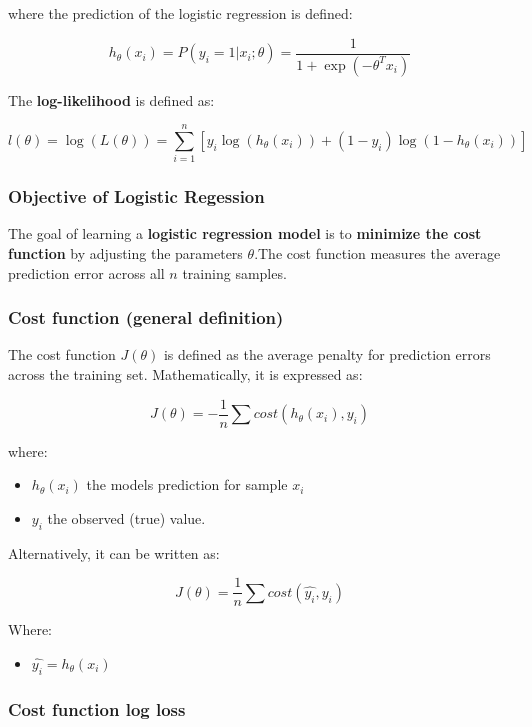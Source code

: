 \documentclass{article}
\providecommand{\tightlist}{%
  \setlength{\itemsep}{0pt}\setlength{\parskip}{0pt}}
\begin{document}
where the prediction of the logistic regression is defined:

\[h_{\theta}(x_i) = P(y_i=1 | x_i; \theta) = \frac{1}{1 + \exp(-\theta^Tx_i)}\]

The \textbf{log-likelihood} is defined as:

\[l(\theta) = \log(L(\theta))=\sum_{i=1}^n[y_i \log (h_{\theta}(x_i)) + (1 - y_i) \log(1 - h_{\theta}(x_i))]\]

\subsubsection{Objective of Logistic
Regession}\label{objective-of-logistic-regession}

The goal of learning a \textbf{logistic regression model} is to
\textbf{minimize the cost function} by adjusting the parameters
\(\theta\).The cost function measures the average prediction error
across all \(n\) training samples.

\subsubsection{Cost function (general
definition)}\label{cost-function-general-definition}

The cost function \(J(\theta)\) is defined as the average penalty for
prediction errors across the training set. Mathematically, it is
expressed as:

\[J(\theta) = -\frac{1}{n} \sum cost(h_\theta(x_i), y_i)\]

where:

\begin{itemize}
\tightlist
\item
  \(h_\theta(x_i)\) the model\textquotesingle s prediction for sample
  \(x_i\)
\item
  \(y_i\) the observed (true) value.
\end{itemize}

Alternatively, it can be written as:

\[J(\theta) = \frac{1}{n} \sum cost(\hat{y_i}, y_i)\]

Where:

\begin{itemize}
\tightlist
\item
  \(\hat{y_i} = h_{\theta}(x_i)\)
\end{itemize}

\subsubsection{\texorpdfstring{Cost function \textbf{log
loss}}{Cost function log loss}}\label{cost-function-log-loss}
\end{document}
